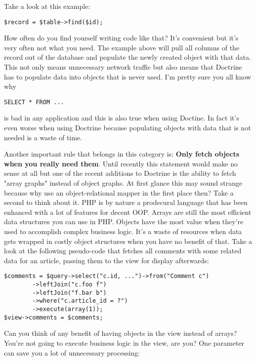 \documentclass[11pt,a4paper]{report}
\begin{document}
Take a look at this example:

\begin{verbatim}
$record = $table->find($id);
\end{verbatim}

How often do you find yourself writing code like that? It's convenient but it's very often not what you need. The example above will pull all columns of the record out of the database and populate the newly created object with that data. This not only means unnecessary network traffic but also means that Doctrine has to populate data into objects that is never used. I'm pretty sure you all know why

\begin{verbatim}
SELECT * FROM ...
\end{verbatim}

 is bad in any application and this is also true when using Doctine. In fact it's even worse when using Doctrine because populating objects with data that is not needed is a waste of time.

Another important rule that belongs in this category is: \textbf{Only fetch objects when you really need them}. Until recently this statement would make no sense at all but one of the recent additions to Doctrine is the ability to fetch "array graphs" instead of object graphs. At first glance this may sound strange because why use an object-relational mapper in the first place then? Take a second to think about it. PHP is by nature a prodecural language that has been enhanced with a lot of features for decent OOP. Arrays are still the most efficient data structures you can use in PHP. Objects have the most value when they're used to accomplish complex business logic. It's a waste of resources when data gets wrapped in costly object structures when you have no benefit of that. Take a look at the following pseudo-code that fetches all comments with some related data for an article, passing them to the view for display afterwards:

\begin{verbatim}
$comments = $query->select("c.id, ...")->from("Comment c")
        ->leftJoin("c.foo f")
        ->leftJoin("f.bar b")
        ->where("c.article_id = ?")
        ->execute(array(1));
$view->comments = $comments;
\end{verbatim}

 Can you think of any benefit of having objects in the view instead of arrays? You're not going to execute business logic in the view, are you? One parameter can save you a lot of unnecessary processing:
\end{document}
